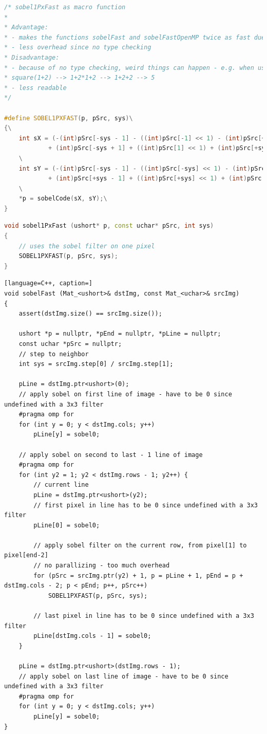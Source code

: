 \documentclass{ezb}
\begin{document}
\begin{lstlisting}[language=C++, caption=sobel1PxFast as macro function]
/* sobel1PxFast as macro function
* 
* Advantage:
* - makes the functions sobelFast and sobelFastOpenMP twice as fast due to forced inlining
* - less overhead since no type checking
* Disadvantage:
* - because of no type checking, weird things can happen - e.g. when used with expressions such as (1+2): #define square(a) a*a
* square(1+2) --> 1+2*1+2 --> 1+2+2 --> 5 
* - less readable
*/

#define SOBEL1PXFAST(p, pSrc, sys)\
{\
	int sX = (-(int)pSrc[-sys - 1] - ((int)pSrc[-1] << 1) - (int)pSrc[+sys - 1]\
			+ (int)pSrc[-sys + 1] + ((int)pSrc[1] << 1) + (int)pSrc[+sys + 1] + 3) >> 3;\
	\
	int sY = (-(int)pSrc[-sys - 1] - ((int)pSrc[-sys] << 1) - (int)pSrc[-sys + 1]\
			+ (int)pSrc[+sys - 1] + ((int)pSrc[+sys] << 1) + (int)pSrc[+sys + 1] + 3) >> 3;\
	\
	*p = sobelCode(sX, sY);\
}
\end{lstlisting}
\newpage
\begin{lstlisting}[language=C++, caption=Core routine for \textbackslash c sobelFast]
void sobel1PxFast (ushort* p, const uchar* pSrc, int sys)
{
	// uses the sobel filter on one pixel
	SOBEL1PXFAST(p, pSrc, sys);
}
\end{lstlisting}

\begin{lstlisting}[language=C++, caption=]
void sobelFast (Mat_<ushort>& dstImg, const Mat_<uchar>& srcImg)
{
	assert(dstImg.size() == srcImg.size()); 

	ushort *p = nullptr, *pEnd = nullptr, *pLine = nullptr; 
	const uchar *pSrc = nullptr; 
	// step to neighbor
	int sys = srcImg.step[0] / srcImg.step[1];

	pLine = dstImg.ptr<ushort>(0);
	// apply sobel on first line of image - have to be 0 since undefined with a 3x3 filter
	#pragma omp for
	for (int y = 0; y < dstImg.cols; y++)
		pLine[y] = sobel0;

	// apply sobel on second to last - 1 line of image
	#pragma omp for
	for (int y2 = 1; y2 < dstImg.rows - 1; y2++) {
		// current line
		pLine = dstImg.ptr<ushort>(y2);
		// first pixel in line has to be 0 since undefined with a 3x3 filter
		pLine[0] = sobel0;

		// apply sobel filter on the current row, from pixel[1] to pixel[end-2]
		// no parallizing - too much overhead
		for (pSrc = srcImg.ptr(y2) + 1, p = pLine + 1, pEnd = p + dstImg.cols - 2; p < pEnd; p++, pSrc++)
			SOBEL1PXFAST(p, pSrc, sys);

		// last pixel in line has to be 0 since undefined with a 3x3 filter
		pLine[dstImg.cols - 1] = sobel0;
	}

	pLine = dstImg.ptr<ushort>(dstImg.rows - 1);
	// apply sobel on last line of image - have to be 0 since undefined with a 3x3 filter
	#pragma omp for
	for (int y = 0; y < dstImg.cols; y++)
		pLine[y] = sobel0;
}
\end{lstlisting}
\end{document}
